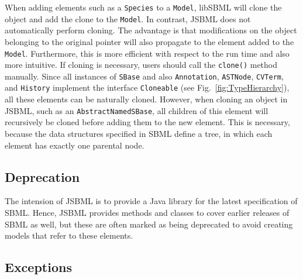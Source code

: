 \documentclass[
  BCOR12mm,
  letterpaper,
  11pt,
  headsepline,
  pointlessnumbers,
  tablecaptionabove,
  onelinecaption,
  headinclude,
  appendixprefix,
  idxtotoc,
  bibtotoc,
  twoside,
  titlepage
]{scrartcl}
\begin{document}
When adding elements such as a \texttt{Species} to a \texttt{Model}, libSBML will
clone the object and add the clone to the \texttt{Model}. In contrast, JSBML does
not automatically perform cloning. The advantage is that modifications on the
object belonging to the original pointer will also propagate to the element
added to the \texttt{Model}. Furthermore, this is more efficient with respect to
the run time and also more intuitive. If cloning is necessary, users should call
the \texttt{clone()} method manually. Since all instances of \texttt{SBase} and also
\texttt{Annotation}, \texttt{ASTNode}, \texttt{CVTerm}, and \texttt{History} implement
the interface \texttt{Cloneable} (see Fig.~\vref{fig:TypeHierarchy}), all these
elements can be naturally cloned. However, when cloning an object in
JSBML, such as an \texttt{AbstractNamedSBase}, all children of this element will recursively be
cloned before adding them to the new element. This is necessary, because the data
structures specified in SBML define a tree, in
which each element has exactly one parental node.


\subsection{Deprecation}

The intension of JSBML is to provide a Java library for
the latest specification of SBML. Hence, JSBML provides methods and
classes to cover earlier releases of SBML as well, but these are often marked
as being deprecated to avoid creating models that refer to these 
elements.

\subsection{Exceptions}
\end{document}
